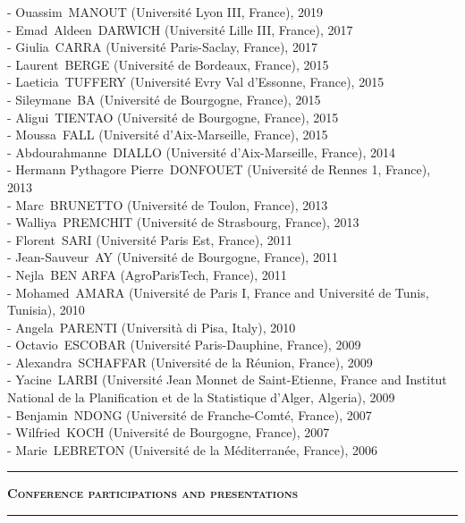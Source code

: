 \documentclass[a4paper,12pt]{article}
\newcommand{\titre}[1]{%
	\bigskip
	\noindent \rule[2mm]{\textwidth}{0.5pt}
	\textbf{\textsc{\large #1}} \\
	\noindent \rule[1mm]{\textwidth}{0.5pt}
	}
\begin{document}
- Ouassim~MANOUT (Université Lyon III, France), 2019 \\ 
- Emad~Aldeen~DARWICH (Université Lille III, France), 2017 \\ 
- Giulia~CARRA (Université Paris-Saclay, France), 2017 \\ 
- Laurent~BERGE (Université de Bordeaux, France), 2015 \\ 
- Laeticia~TUFFERY (Université Evry Val d'Essonne, France), 2015 \\ 
- Sileymane~BA (Université de Bourgogne, France), 2015 \\ 
- Aligui~TIENTAO (Université de Bourgogne, France), 2015 \\ 	
- Moussa~FALL (Université d'Aix-Marseille, France), 2015 \\ 
- Abdourahmanne~DIALLO (Université d'Aix-Marseille, France), 2014 \\ 
- Hermann Pythagore Pierre~DONFOUET (Université de Rennes 1, France), 2013 \\ 
- Marc~BRUNETTO (Université de Toulon, France), 2013 \\ 
- Walliya~PREMCHIT (Université de Strasbourg, France), 2013 \\ 
- Florent~SARI (Université Paris Est, France), 2011 \\ 
- Jean-Sauveur~AY (Université de Bourgogne, France), 2011 \\
- Nejla~BEN ARFA (AgroParisTech, France), 2011 \\
- Mohamed~AMARA (Université de Paris I, France and Université de Tunis, Tunisia), 2010 \\
- Angela~PARENTI (Università di Pisa, Italy), 2010 \\ 
- Octavio~ESCOBAR (Université Paris-Dauphine, France), 2009 \\	
- Alexandra~SCHAFFAR (Université de la Réunion, France), 2009 \\	
- Yacine~LARBI (Université Jean Monnet de Saint-Etienne, France and Institut National de la Planification et de la Statistique d'Alger, Algeria), 2009 \\
- Benjamin~NDONG (Université de Franche-Comté, France), 2007 \\
- Wilfried~KOCH (Université de Bourgogne, France), 2007 \\
- Marie~LEBRETON (Université de la Méditerranée, France), 2006 \\


\titre{Conference participations and presentations}
\end{document}
